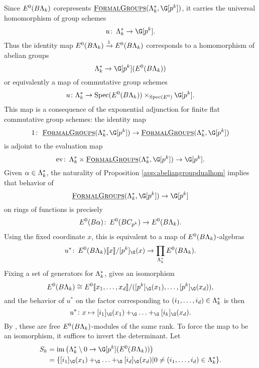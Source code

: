Since \(E^0(B\Lambda_k)\) corepresents \(\InternalHom{FormalGroups}(\Lk^*,\G[p^k])\), it carries the universal homomorphism of group schemes
\[
u \co \Lk^* \rightarrow \G[p^k].
\]
Thus the identity map \(E^0(B\Lambda_k) \xrightarrow{1} E^0(B\Lambda_k)\) corresponds to a homomorphism of abelian groups
\[
\Lk^* \rightarrow \G[p^k](E^0(B\Lk))
\]
or equivalently a map of commutative group schemes
\[
u \colon \Lk^* \rightarrow \Spec(E^0(B\Lk)) \times_{\Spec(E^0)} \G[p^k].
\]
This map is a consequence of the exponential adjunction for finite flat commutative group schemes: the identity map
\[
1 \co \InternalHom{FormalGroups}(\Lk^*,\G[p^k]) \to \InternalHom{FormalGroups}(\Lk^*,\G[p^k])
\]
is adjoint to the evaluation map
\[
\mathrm{ev} \co \Lk^* \times  \InternalHom{FormalGroups}(\Lk^*,\G[p^k]) \to \G[p^k].
\]
Given \(\alpha \in \Lambda_k^*\), the naturality of Proposition \ref{app:abeliangroupdualhom} implies that behavior of
\[
\InternalHom{FormalGroups}(\Lk^*,\G[p^k]) \to \G[p^k]
\]
on rings of functions is precisely
\begin{equation}
E^0(B\alpha) \colon\thinspace E^0(BC_{p^k}) \to E^0(B\Lambda_k).
\end{equation}
Using the fixed coordinate \(x\), this is equivalent to a map of \(E^0(B\Lambda_k)\)-algebras
\begin{equation}
u^* \co E^0(B\Lk)\ps{x}/[p^k]_{\G}(x) \xrightarrow{} \prod_{\Lk^*} E^0(B\Lk).
\end{equation}
Fixing a set of generators for \(\Lambda_k^*\), gives an isomorphism
\[
E^0(B\Lk) \cong E^0\ps{x_1, \ldots, x_d}/([p^k]_{\G}(x_1), \ldots, [p^k]_{\G}(x_d)),
\]
and the behavior of \(u^*\) on the factor corresponding to \((i_1, \ldots, i_d) \in \Lambda_k^*\) is then
\[
u^* \colon x \mapsto [i_1]_{\G}(x_1)+_{\G} \ldots +_{\G} [i_k]_{\G}(x_d).
\]
By , these are free \(E^0(B\Lambda_k)\)-modules of the same rank. To force the map to be an isomorphism, it suffices to invert the determinant. Let
\begin{align*}
S_k &= \im \big (\Lk^* \setminus 0 \rightarrow \G[p^k](E^0(B\Lk)) \big ) \\ &= \{ [i_1]_{\G}(x_1)+_{\G} \ldots +_{\G} [i_d]_{\G}(x_d)| 0 \neq (i_1, \ldots, i_d) \in \Lk^* \}.
\end{align*}

